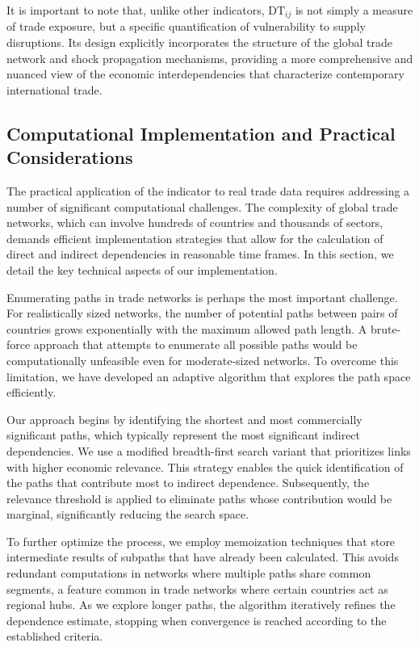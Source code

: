 \documentclass[final,1p,times,authoryear]{elsarticle}
\begin{document}
It is important to note that, unlike other indicators, $\text{DT}_{ij}$ is not simply a measure of trade exposure, but a specific quantification of vulnerability to supply disruptions. Its design explicitly incorporates the structure of the global trade network and shock propagation mechanisms, providing a more comprehensive and nuanced view of the economic interdependencies that characterize contemporary international trade.

\subsection{Computational Implementation and Practical Considerations}

The practical application of the indicator to real trade data requires addressing a number of significant computational challenges. The complexity of global trade networks, which can involve hundreds of countries and thousands of sectors, demands efficient implementation strategies that allow for the calculation of direct and indirect dependencies in reasonable time frames. In this section, we detail the key technical aspects of our implementation.

Enumerating paths in trade networks is perhaps the most important challenge. For realistically sized networks, the number of potential paths between pairs of countries grows exponentially with the maximum allowed path length. A brute-force approach that attempts to enumerate all possible paths would be computationally unfeasible even for moderate-sized networks. To overcome this limitation, we have developed an adaptive algorithm that explores the path space efficiently.

Our approach begins by identifying the shortest and most commercially significant paths, which typically represent the most significant indirect dependencies. We use a modified breadth-first search variant that prioritizes links with higher economic relevance. This strategy enables the quick identification of the paths that contribute most to indirect dependence. Subsequently, the relevance threshold is applied to eliminate paths whose contribution would be marginal, significantly reducing the search space.

To further optimize the process, we employ memoization techniques that store intermediate results of subpaths that have already been calculated. This avoids redundant computations in networks where multiple paths share common segments, a feature common in trade networks where certain countries act as regional hubs. As we explore longer paths, the algorithm iteratively refines the dependence estimate, stopping when convergence is reached according to the established criteria.
\end{document}
